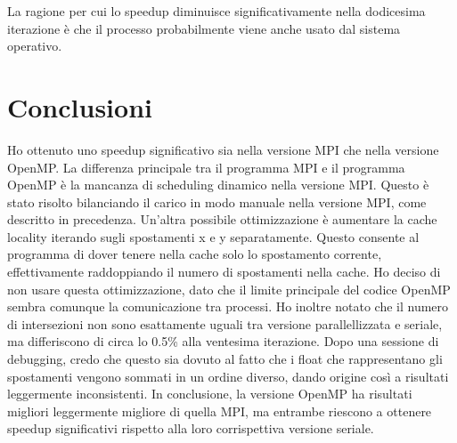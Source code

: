 \documentclass[a4paper,11pt, twoside]{report}
\begin{document}
La ragione per cui lo speedup diminuisce significativamente nella dodicesima iterazione è che il processo probabilmente viene anche usato dal sistema operativo.
\section*{Conclusioni}
Ho ottenuto uno speedup significativo sia nella versione MPI che nella versione OpenMP.
La differenza principale tra il programma MPI e il programma OpenMP è la mancanza di scheduling dinamico nella versione MPI.
Questo è stato risolto bilanciando il carico in modo manuale nella versione MPI, come descritto in precedenza.
Un'altra possibile ottimizzazione è aumentare la cache locality iterando sugli spostamenti x e y separatamente.
Questo consente al programma di dover tenere nella cache solo lo spostamento corrente, effettivamente raddoppiando il numero di spostamenti nella cache.
Ho deciso di non usare questa ottimizzazione, dato che il limite principale del codice OpenMP sembra comunque la comunicazione tra processi.
Ho inoltre notato che il numero di intersezioni non sono esattamente uguali tra versione parallellizzata e seriale, ma differiscono di circa lo 0.5\% alla ventesima iterazione.
Dopo una sessione di debugging, credo che questo sia dovuto al fatto che i float che rappresentano gli spostamenti vengono sommati in un ordine diverso, dando origine così a risultati leggermente inconsistenti.
In conclusione, la versione OpenMP ha risultati migliori leggermente migliore di quella MPI, ma entrambe riescono a ottenere speedup significativi rispetto alla loro corrispettiva versione seriale.
\end{document}
